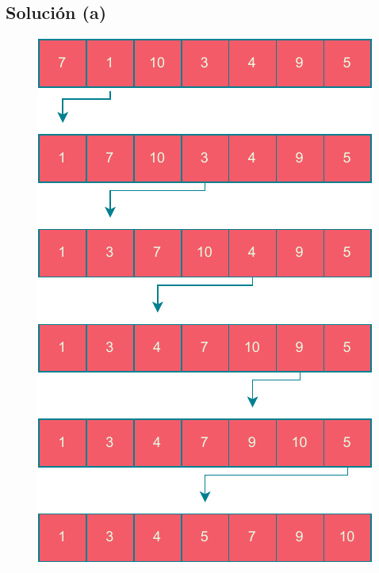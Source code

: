 \documentclass{article}
\begin{document}
\subsection{Solución (a)}
\begin{figure}[h]
    \centering
    \includegraphics[scale=0.6]{./estáticos/7a.pdf}
\end{figure}
\end{document}
